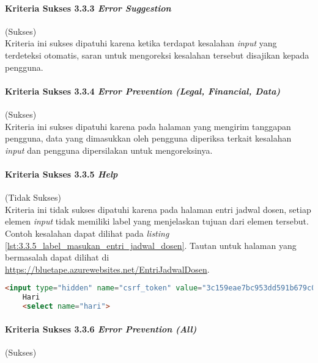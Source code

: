 \paragraph{Kriteria Sukses 3.3.3 \textit{Error Suggestion}}
\label{par:kepatuhan_bluetape_kriteria_sukses_3.3.3}
(Sukses)\\

Kriteria ini sukses dipatuhi karena ketika terdapat kesalahan \textit{input} yang terdeteksi otomatis, saran untuk mengoreksi kesalahan tersebut disajikan kepada pengguna.

\paragraph{Kriteria Sukses 3.3.4 \textit{Error Prevention (Legal, Financial, Data)}}
\label{par:kepatuhan_bluetape_kriteria_sukses_3.3.4}
(Sukses)\\

Kriteria ini sukses dipatuhi karena pada halaman yang mengirim tanggapan pengguna, data yang dimasukkan oleh pengguna diperiksa terkait kesalahan \textit{input} dan pengguna dipersilakan untuk mengoreksinya.

\paragraph{Kriteria Sukses 3.3.5 \textit{Help}}
\label{par:kepatuhan_bluetape_kriteria_sukses_3.3.5}
(Tidak Sukses)\\

Kriteria ini tidak sukses dipatuhi karena pada halaman entri jadwal dosen, setiap elemen \textit{input} tidak memiliki label yang menjelaskan tujuan dari elemen tersebut. Contoh kesalahan dapat dilihat pada \textit{listing} \ref{lst:3.3.5_label_masukan_entri_jadwal_dosen}. Tautan untuk halaman yang bermasalah dapat dilihat di \url{https://bluetape.azurewebsites.net/EntriJadwalDosen}.

\begin{lstlisting}[frame=single, label={lst:3.3.5_label_masukan_entri_jadwal_dosen}, language=HTML, caption=Pelanggaran Kriteria Sukses 3.3.5 pada Halaman Entri Jadwal Dosen]
    <input type="hidden" name="csrf_token" value="3c159eae7bc953dd591b679c080ed066"/>
    Hari
    <select name="hari">
\end{lstlisting}

\paragraph{Kriteria Sukses 3.3.6 \textit{Error Prevention (All)}}
\label{par:kepatuhan_bluetape_kriteria_sukses_3.3.6}
(Sukses)\\

